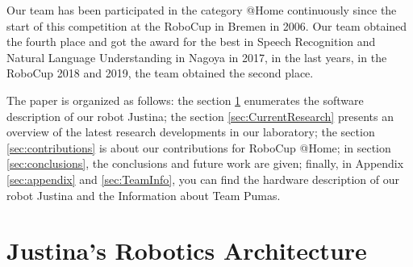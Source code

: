 \documentclass{llncs}
\begin{document}
Our team has been participated in the category @Home continuously since the start of this competition at the RoboCup in Bremen in 2006. Our team obtained the fourth place and got the award for the best in Speech Recognition and Natural Language Understanding in Nagoya in 2017, in the last years, in the RoboCup 2018 and 2019, the team obtained the second place.

The paper is organized as follows:
the section \ref{sec:background} enumerates the software description of our robot
Justina; the section \ref{sec:CurrentResearch}  presents  an overview of the latest research developments in our laboratory; the section \ref{sec:contributions} is about our contributions for RoboCup @Home;
in section \ref{sec:conclusions}, the conclusions and future work are given;
finally, in Appendix \ref{sec:appendix} and \ref{sec:TeamInfo}, you can find the hardware description of our robot Justina and the Information about Team Pumas.


\section{Justina's Robotics Architecture}\label{sec:background}





\end{document}
